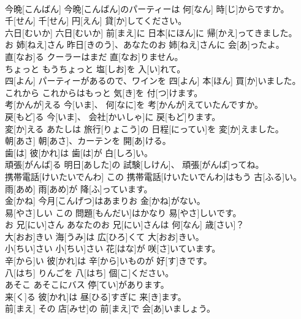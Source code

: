 \documentclass[8pt]{extreport}
\begin{document}
\begin{CJK}{UTF8}{min}
\\	今晩[こんばん]	今晩[こんばん]のパーティーは 何[なん] 時[じ]からですか。		
\\	千[せん]	千[せん] 円[えん] 貸[か]してください。		
\\	六日[むいか]	六日[むいか] 前[まえ]に 日本[にほん]に 帰[かえ]ってきました。		
\\	お 姉[ねえ]さん	昨日[きのう]、あなたのお 姉[ねえ]さんに 会[あ]ったよ。		
\\	直[なお]る	クーラーはまだ 直[なお]りません。		
\\	ちょっと	もうちょっと 塩[しお]を 入[い]れて。		
\\	四[よん]	パーティーがあるので、ワインを 四[よん] 本[ほん] 買[か]いました。		
\\	これから	これからはもっと 気[き]を 付[つ]けます。		
\\	考[かんが]える	今[いま]、 何[なに]を 考[かんが]えていたんですか。		
\\	戻[もど]る	今[いま]、 会社[かいしゃ]に 戻[もど]ります。		
\\	変[か]える	あたしは 旅行[りょこう]の 日程[にってい]を 変[か]えました。		
\\	朝[あさ]	朝[あさ]、カーテンを 開[あ]ける。		
\\	歯[は]	彼[かれ]は 歯[は]が 白[しろ]い。		
\\	頑張[がんば]る	明日[あした]の 試験[しけん]、 頑張[がんば]ってね。		
\\	携帯電話[けいたいでんわ]	この 携帯電話[けいたいでんわ]はもう 古[ふる]い。		
\\	雨[あめ]	雨[あめ]が 降[ふ]っています。		
\\	金[かね]	今月[こんげつ]はあまりお 金[かね]がない。		
\\	易[やさ]しい	この 問題[もんだい]はかなり 易[やさ]しいです。		
\\	お 兄[にい]さん	あなたのお 兄[にい]さんは 何[なん] 歳[さい]？		
\\	大[おお]きい	海[うみ]は 広[ひろ]くて 大[おお]きい。		
\\	小[ちい]さい	小[ちい]さい 花[はな]が 咲[さ]いています。		
\\	辛[から]い	彼[かれ]は 辛[から]いものが 好[す]きです。		
\\	八[はち]	りんごを 八[はち] 個[こ]ください。		
\\	あそこ	あそこにバス 停[てい]があります。		
\\	来[く]る	彼[かれ]は 昼[ひる]すぎに 来[き]ます。		
\\	前[まえ]	その 店[みせ]の 前[まえ]で 会[あ]いましょう。		

\end{CJK}
\end{document}
